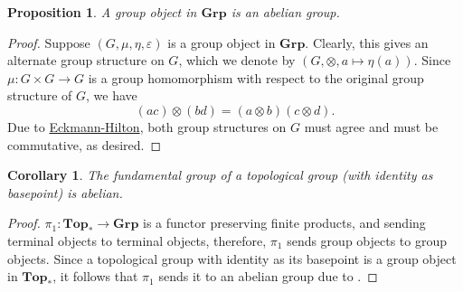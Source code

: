 \documentclass[11pt]{article}
\theoremstyle{thmstyle}
\newtheorem{proposition}[theorem]{Proposition}
\theoremstyle{defstyle}
\newtheorem{corollary}[theorem]{Corollary}
\newcommand{\catGrp}{\mathbf{Grp}}
\newcommand{\catTop}{\mathbf{Top}}
\begin{document}
\begin{proposition}
	A group object in $\catGrp$ is an abelian group.
\end{proposition}
\begin{proof}
	Suppose $(G, \mu, \eta, \varepsilon)$ is a group object in $\catGrp$. Clearly, this gives an alternate group structure on $G$, which we denote by $(G, \otimes, a\mapsto\eta(a))$. Since $\mu\colon G\times G\to G$ is a group homomorphism with respect to the original group structure of $G$, we have 
	\begin{equation*}
		(ac)\otimes(bd) = (a\otimes b)(c\otimes d).
	\end{equation*}
	Due to \href{https://en.wikipedia.org/wiki/Eckmann%E2%80%93Hilton_argument}{Eckmann-Hilton}, both group structures on $G$ must agree and must be commutative, as desired.
\end{proof}
\begin{corollary}
	The fundamental group of a topological group (with identity as basepoint) is abelian.
\end{corollary}
\begin{proof}
	$\pi_1\colon\catTop_\ast\to\catGrp$ is a functor preserving finite products, and sending terminal objects to terminal objects, therefore, $\pi_1$ sends group objects to group objects. Since a topological group with identity as its basepoint is a group object in $\catTop_\ast$, it follows that $\pi_1$ sends it to an abelian group due to .
\end{proof}
\end{document}
